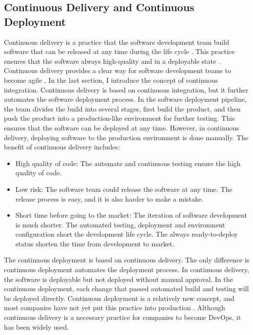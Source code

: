 \subsection{Continuous Delivery and Continuous Deployment}
\label{CD}
Continuous delivery is a practice that the software development team build software that can be released at any time during the life cycle \cite{fowler2013continuous}. This practice ensures that the software always high-quality and in a deployable state \cite{WhatisCo47:online}. Continuous delivery provides a clear way for software development teams to become agile \cite{Whyagile27:online}\cite{IsContin85:online}. In the last section, I introduce the concept of continuous integration.  Continuous delivery is based on continuous integration, but it further automates the software deployment process. In the software deployment pipeline, the team divides the build into several stages, first build the product, and then push the product into a production-like environment for further testing. This ensures that the software can be deployed at any time. However, in continuous delivery, deploying software to the production environment is done manually.
The benefit \cite{WhatisCo47:online}\cite{fowler2013continuous} of continuous delivery includes:
\begin{itemize}
    \item High quality of code: The automate and continuous testing ensure the high quality of code.
    \item Low risk: The software team could release the software at any time. The release process is easy, and it is also harder to make a mistake.
    \item Short time before going to the market: The iteration of software development is much shorter. The automated testing, deployment and environment configuration short the development life cycle. The always ready-to-deploy status shorten the time from development to market.
\end{itemize}
The continuous deployment is based on continuous delivery. The only difference is continuous deployment automates the deployment process. In continuous delivery, the software is deployable but not deployed without manual approval. In the continuous deployment, each change that passed automated build and testing will be deployed directly.
Continuous deployment is a relatively new concept, and most companies have not yet put this practice into production \cite{leppanen2015highways}. Although continuous delivery is a necessary practice for companies to become DevOps, it has been widely used.
